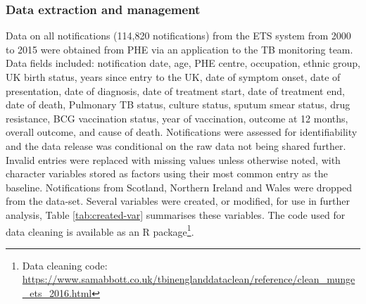 \documentclass[11pt,twoside]{bristolthesis}
\begin{document}
  \hypertarget{data-extraction-and-management}{%
  \subsubsection{Data extraction and management}\label{data-extraction-and-management}}
  
  Data on all notifications (114,820 notifications) from the ETS system from 2000 to 2015 were obtained from PHE via an application to the TB monitoring team. Data fields included: notification date, age, PHE centre, occupation, ethnic group, UK birth status, years since entry to the UK, date of symptom onset, date of presentation, date of diagnosis, date of treatment start, date of treatment end, date of death, Pulmonary TB status, culture status, sputum smear status, drug resistance, BCG vaccination status, year of vaccination, outcome at 12 months, overall outcome, and cause of death. Notifications were assessed for identifiability and the data release was conditional on the raw data not being shared further. Invalid entries were replaced with missing values unless otherwise noted, with character variables stored as factors using their most common entry as the baseline. Notifications from Scotland, Northern Ireland and Wales were dropped from the data-set. Several variables were created, or modified, for use in further analysis, Table \ref{tab:created-var} summarises these variables. The code used for data cleaning is available as an R package\footnote{Data cleaning code: \url{https://www.samabbott.co.uk/tbinenglanddataclean/reference/clean_munge_ets_2016.html}}.
\end{document}
